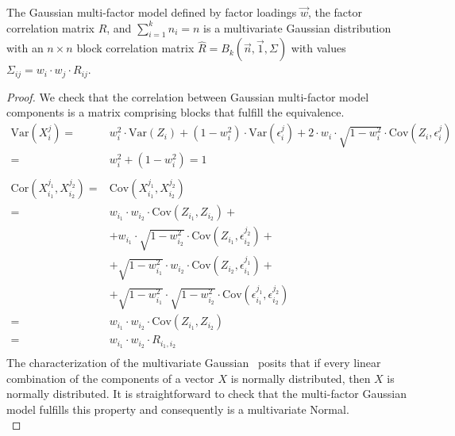 \documentclass[11pt,fleqn]{book} %
\begin{document}
\begin{proposition}
	\label{prop:gmfigs}
	The Gaussian multi-factor model defined by factor loadings $\vec{w}$,
	the factor correlation matrix $R$, and $\sum_{i=1}^k n_i = n$ is a 
	multivariate Gaussian distribution with an $n {\times} n$ block 
	correlation matrix $\widehat{R}=B_k(\vec{n},\vec{1},\Sigma)$ 
	with values $\Sigma_{ij} = w_i \cdot w_j \cdot R_{ij}$.
\end{proposition}
\begin{proof}
	We check that the correlation between Gaussian multi-factor model
	components is a matrix comprising blocks that fulfill the equivalence.
	\begin{displaymath}
		\begin{array}{rl}
			\text{Var}(X_i^j) =                       &
			w_i^2 \cdot \text{Var}(Z_i) + (1-w_i^2) \cdot \text{Var}(\epsilon_i^j) +
			2 \cdot w_i \cdot \sqrt{1-w_i^2} \cdot \text{Cov}(Z_i, \epsilon_i^j)    \\
			=                                         & w_i^2 + (1-w_i^2) = 1       \\
			                                          &                             \\
			\text{Cor}(X_{i_1}^{j_1},X_{i_2}^{j_2}) = & \text{Cov}(X_{i_1}^{j_1},X_{i_2}^{j_2})                                                                    \\
			=                                         & w_{i_1} \cdot w_{i_2} \cdot \text{Cov}(Z_{i_1},Z_{i_2}) +                                                  \\
			                                          & + w_{i_1} \cdot \sqrt{1-w_{i_2}^2} \cdot \text{Cov}(Z_{i_1}, \epsilon_{i_2}^{j_2}) +                       \\
			                                          & + \sqrt{1-w_{i_1}^2} \cdot w_{i_2} \cdot \text{Cov}(Z_{i_2}, \epsilon_{i_1}^{j_1}) +                       \\
			                                          & + \sqrt{1-w_{i_1}^2} \cdot \sqrt{1-w_{i_2}^2} \cdot \text{Cov}(\epsilon_{i_1}^{j_1}, \epsilon_{i_2}^{j_2}) \\
			=                                         & w_{i_1} \cdot w_{i_2} \cdot \text{Cov}(Z_{i_1}, Z_{i_2})                                                   \\
			=                                         & w_{i_1} \cdot w_{i_2} \cdot R_{i_1,i_2}                                                                    \\
		\end{array}
	\end{displaymath}
	The characterization of the multivariate Gaussian~\cite[thm. 2.6.2]{anderson:1984}
	posits that if every linear combination of the components of a 
	vector $X$ is normally distributed, then $X$ is normally distributed.
	It is straightforward to check that the multi-factor Gaussian model 
	fulfills this property and consequently is a multivariate Normal.
	\\
\end{proof}
\end{document}
